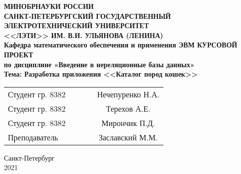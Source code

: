 \begin{titlepage}

\begin{center}
\textbf{
МИНОБРНАУКИ РОССИИ \\
САНКТ-ПЕТЕРБУРГСКИЙ ГОСУДАРСТВЕННЫЙ \\
ЭЛЕКТРОТЕХНИЧЕСКИЙ УНИВЕРСИТЕТ \\
<<ЛЭТИ>> ИМ. В.И. УЛЬЯНОВА (ЛЕНИНА) \\
Кафедра математического обеспечения и применения ЭВМ
\vfill
КУРСОВОЙ ПРОЕКТ\\
по дисциплине «Введение в нереляционные базы данных»\\
Тема: Разработка приложения <<Каталог пород кошек>>
\vfill
}
\begin{tabular}{ l c c c c }
 Студент гр. 8382 & \hspace{2cm} & \underline{\hspace{4cm}} & \hspace{1cm} & Нечепуренко Н.А. \\
 Студент гр. 8382 & \hspace{2cm} & \underline{\hspace{4cm}} & \hspace{1cm} & Терехов А.Е. \\
 Студент гр. 8382 & \hspace{2cm} & \underline{\hspace{4cm}} & \hspace{1cm} & Мирончик П.Д. \\
 Преподаватель & \hspace{2cm} & \underline{\hspace{4cm}} & \hspace{1cm} & Заславский М.М.
\end{tabular}

\vspace{3cm}

Санкт-Петербург\\
2021
\end{center}

\end{titlepage}
